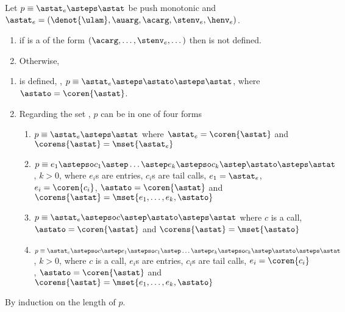 \documentclass{LMCS}
\theoremstyle{definition} \newtheorem{property}[thm]{Property}
\begin{document}
\begin{lem}\label{lem:decomp} 
  Let $p \equiv \entry \asteps \astat$ be push monotonic and
  $\entry = (\denot{\ulam}, \auarg, \acarg, \stenv_e, \henv_e)$.
  \begin{enumerate}[$\bullet$]
  \item if \astat{} is a \dacapply{} of the form
    $(\acarg, \dots, \stenv_e, \dots)$
    then \coren{\astat} is not defined.
  \item Otherwise,
  \end{enumerate}
    \begin{enumerate}[\quad\em(1)]
    \item\label{lem:decomp,case:coren}
      \coren{\astat} is defined, \ie{},
      $p \equiv \entry \asteps \astato \asteps \astat$,
      where $\astato = \coren{\astat}$.
    \item\label{lem:decomp,case:corens}
      Regarding the set \corens{\astat}, $p$ can be in one of four forms
      \begin{enumerate}[\em(a)]
      \item\label{lem:decomp,case:corens1}
        $p \equiv \entry \asteps \astat$ 
        where $\entry = \coren{\astat}$ and $\corens{\astat} = \mset{\entry}$
      \item\label{lem:decomp,case:corens2}
        $p \equiv e_1 \astepso c_1 \astep \dots \astep e_k \astepso c_k \astep 
        \astato \asteps \astat$, $k > 0$,
        where $e_i$s are entries, $c_i$s are tail calls,
        $e_1 = \entry$, $e_i = \coren{c_i}$, $\astato = \coren{\astat}$
        and $\corens{\astat} = \mset{e_1, \dots, e_k, \astato}$
      \item\label{lem:decomp,case:corens3}
        $p \equiv \entry \astepso c \astep \astato \asteps \astat$ 
        where $c$ is a call, $\astato = \coren{\astat}$
        and $\corens{\astat} = \mset{\astato}$
      \item\label{lem:decomp,case:corens4}
        $p \equiv \entry \astepso c \astep 
        e_1 \astepso c_1 \astep \dots \astep e_k \astepso c_k 
        \astep \astato \asteps \astat$, $k > 0$,
        where $c$ is a call, $e_i$s are entries, $c_i$s are tail calls,
        $e_i = \coren{c_i}$, $\astato = \coren{\astat}$
        and $\corens{\astat} = \mset{e_1, \dots, e_k, \astato}$
      \end{enumerate}
    \end{enumerate}
\end{lem}
\proof
By induction on the length of $p$. \\
\end{document}
